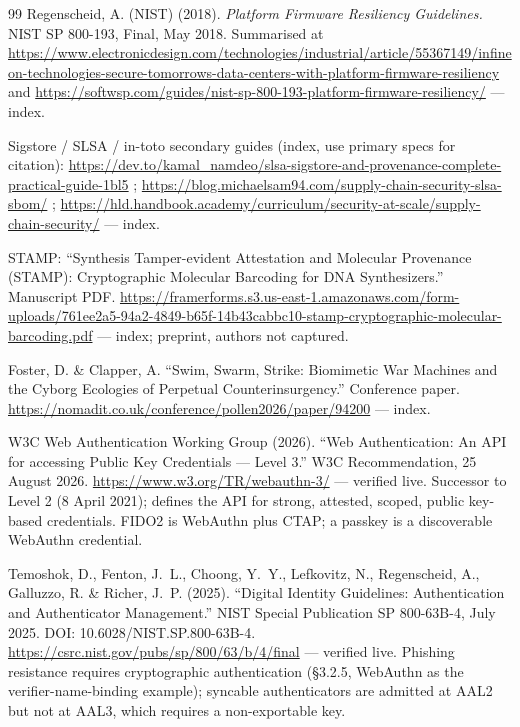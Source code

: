 \documentclass[11pt]{article}
\begin{document}
\begin{thebibliography}{99}
 Regenscheid, A. (NIST) (2018). \emph{Platform
Firmware Resiliency Guidelines.} NIST SP 800-193, Final, May 2018.
Summarised at
\url{https://www.electronicdesign.com/technologies/industrial/article/55367149/infineon-technologies-secure-tomorrows-data-centers-with-platform-firmware-resiliency}
and
\url{https://softwsp.com/guides/nist-sp-800-193-platform-firmware-resiliency/}
--- index.

 Sigstore / SLSA / in-toto secondary guides
(index, use primary specs for citation):
\url{https://dev.to/kamal_namdeo/slsa-sigstore-and-provenance-complete-practical-guide-1bl5} ;
\url{https://blog.michaelsam94.com/supply-chain-security-slsa-sbom/} ;
\url{https://hld.handbook.academy/curriculum/security-at-scale/supply-chain-security/}
--- index.

 STAMP: ``Synthesis Tamper-evident Attestation and
Molecular Provenance (STAMP): Cryptographic Molecular Barcoding for DNA
Synthesizers.'' Manuscript PDF.
\url{https://framerforms.s3.us-east-1.amazonaws.com/form-uploads/761ee2a5-94a2-4849-b65f-14b43cabbc10-stamp-cryptographic-molecular-barcoding.pdf}
--- index; preprint, authors not captured.

 Foster, D. \& Clapper, A. ``Swim, Swarm, Strike:
Biomimetic War Machines and the Cyborg Ecologies of Perpetual
Counterinsurgency.'' Conference paper.
\url{https://nomadit.co.uk/conference/pollen2026/paper/94200} --- index.

 W3C Web Authentication Working Group (2026). ``Web
Authentication: An API for accessing Public Key Credentials --- Level
3.'' W3C Recommendation, 25 August 2026.
\url{https://www.w3.org/TR/webauthn-3/} --- verified live. Successor to
Level 2 (8 April 2021); defines the API for strong, attested, scoped,
public key-based credentials. FIDO2 is WebAuthn plus CTAP; a passkey is
a discoverable WebAuthn credential.

 Temoshok, D., Fenton, J.~L., Choong, Y.~Y.,
Lefkovitz, N., Regenscheid, A., Galluzzo, R. \& Richer, J.~P. (2025).
``Digital Identity Guidelines: Authentication and Authenticator
Management.'' NIST Special Publication SP 800-63B-4, July 2025. DOI:
10.6028/NIST.SP.800-63B-4.
\url{https://csrc.nist.gov/pubs/sp/800/63/b/4/final} --- verified live.
Phishing resistance requires cryptographic authentication (\S3.2.5,
WebAuthn as the verifier-name-binding example); syncable authenticators
are admitted at AAL2 but not at AAL3, which requires a non-exportable
key.


\end{thebibliography}
\end{document}
